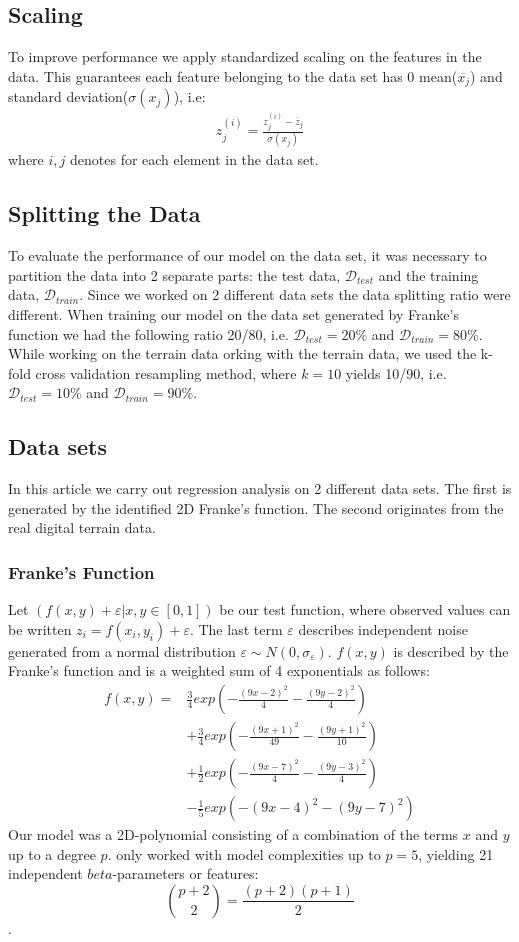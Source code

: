 \documentclass[aps,rmp,reprint,amsmath,amssymb,graphicx,longbibliography]{revtex4-1}
\begin{document}
\subsection{Scaling}
To improve performance we apply standardized scaling on the features in the data\cite{scikit-learn}. This guarantees each feature belonging to the data set has 0 mean($\overline{x_j}$) and standard deviation($\sigma(x_j)$), i.e:
\begin{align*}
    z^{(i)}_j=\frac{z^{(i)}_j-\overline{z}_j}{\sigma(x_j)}
\end{align*}
where $i,j$ denotes for each element in the data set. 

\subsection{Splitting the Data}
To evaluate the performance of our model on the data set, it was necessary to partition the data into 2 separate parts: the test data, $\mathcal{D}_{test}$ and the training data, $\mathcal{D}_{train}$.
Since we worked on 2 different data sets the data splitting ratio were different. When training our model on the data set generated by Franke's function we had the following ratio 20/80, i.e. $\mathcal{D}_{test}=20\%$ and $\mathcal{D}_{train}=80\%$.  
While working on the terrain data  
orking with the terrain data, we used the k-fold cross validation resampling method, where $k=10$ yields 10/90, i.e.  $\mathcal{D}_{test}=10\%$ and $\mathcal{D}_{train}=90\%$. 

\subsection{Data sets}
In this article we carry out regression analysis on 2 different data sets. The first is generated by the identified 2D Franke's function. The second originates from the real digital terrain data\cite{lectureNotes2024}.

\subsubsection{Franke's Function}
Let $(f(x,y) +\varepsilon |x,y\in[0,1])$ be our test function, where observed values can be written $z_i=f(x_i,y_i)+\varepsilon$. The last term $\varepsilon$ describes independent noise generated from a normal distribution $\varepsilon\sim N(0,\sigma_\varepsilon)$. $f(x,y)$ is described by the Franke's function and is a weighted sum of 4 exponentials as follows:
\begin{align*}
    f(x,y)=&\frac{3}{4}exp(-\frac{(9x-2)^2}{4}-\frac{(9y-2)^2}{4})\\&+\frac{3}{4}exp(-\frac{(9x+1)^2}{49}-\frac{(9y+1)^2}{10})\\&+\frac{1}{2}exp(-\frac{(9x-7)^2}{4}-\frac{(9y-3)^2}{4})\\&-\frac{1}{5}exp(-(9x-4)^2-(9y-7)^2)
\end{align*}
Our model was a 2D-polynomial consisting of a combination of the terms $x$  and $y$ up to a degree $p$.  only worked with model complexities up to $p=5$, yielding 21 independent $beta$-parameters or features: $$\binom{p+2}{2} = \frac{(p+2)(p+1)}{2}$$. 
\end{document}
